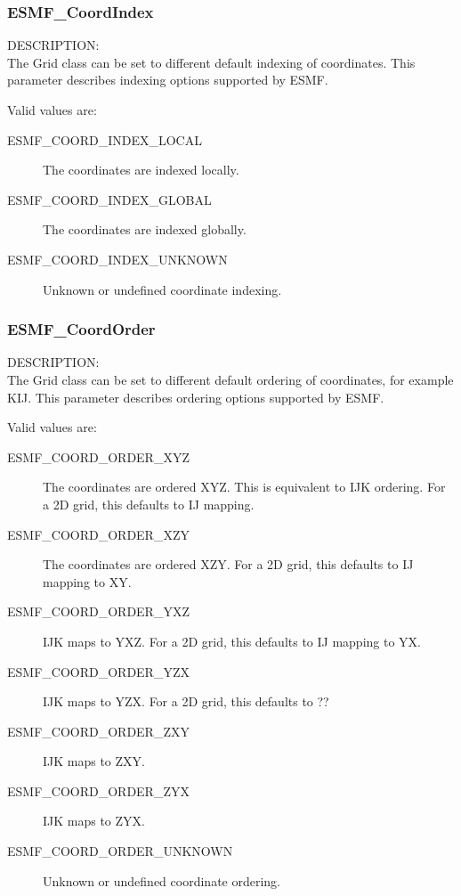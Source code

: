 
\subsubsection{ESMF\_CoordIndex}

{\sf DESCRIPTION:\\}
The Grid class can be set to different default indexing of coordinates.  This
parameter describes indexing options supported by ESMF.

Valid values are:
\begin{description}
   \item [ESMF\_COORD\_INDEX\_LOCAL]
         The coordinates are indexed locally.  

   \item [ESMF\_COORD\_INDEX\_GLOBAL]
         The coordinates are indexed globally.

   \item [ESMF\_COORD\_INDEX\_UNKNOWN]
         Unknown or undefined coordinate indexing.
\end{description}

\subsubsection{ESMF\_CoordOrder}

{\sf DESCRIPTION:\\}
The Grid class can be set to different default ordering of coordinates, for
example KIJ.  This parameter describes ordering options supported by ESMF.

Valid values are:
\begin{description}
   \item [ESMF\_COORD\_ORDER\_XYZ]
         The coordinates are ordered XYZ.  This is equivalent to IJK ordering.
         For a 2D grid, this defaults to IJ mapping.

   \item [ESMF\_COORD\_ORDER\_XZY]
         The coordinates are ordered XZY.  For a 2D grid, this defaults to IJ 
         mapping to XY.

   \item [ESMF\_COORD\_ORDER\_YXZ]
         IJK maps to YXZ.  For a 2D grid, this defaults to IJ mapping to YX.

   \item [ESMF\_COORD\_ORDER\_YZX]
         IJK maps to YZX.  For a 2D grid, this defaults to ??

   \item [ESMF\_COORD\_ORDER\_ZXY]
         IJK maps to ZXY.

   \item [ESMF\_COORD\_ORDER\_ZYX]
         IJK maps to ZYX.

   \item [ESMF\_COORD\_ORDER\_UNKNOWN]
         Unknown or undefined coordinate ordering.
\end{description}

